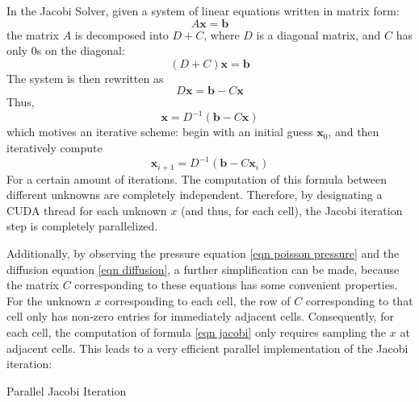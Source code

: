 In the Jacobi Solver, given a system of linear equations written in matrix form:
$$
A\textbf{x}=\textbf{b}
$$
the matrix $A$ is decomposed into $D+C$, where $D$ is a diagonal matrix, and $C$ has only $0$s on the diagonal:
$$
(D+C)\textbf{x}=\textbf{b}
$$
The system is then rewritten as 
$$
D\textbf{x}=\textbf{b} - C\textbf{x}
$$
Thus,
$$
\textbf{x}=D^{-1}(\textbf{b} - C\textbf{x})
$$
which motives an iterative scheme: begin with an initial guess $\textbf{x}_0$, and then iteratively compute
\begin{equation}
    \textbf{x}_{i+1} = D^{-1}(\textbf{b} - C\textbf{x}_{i})
    \label{eqn jacobi}
\end{equation}
For a certain amount of iterations. The computation of this formula between different unknowns are completely independent. Therefore, by designating a CUDA thread for each unknown $x$ (and thus, for each cell), the Jacobi iteration step is completely parallelized.

Additionally, by observing the pressure equation \ref{eqn poisson pressure} and the diffusion equation \ref{eqn diffusion}, a further simplification can be made, because the matrix $C$ corresponding to these equations has some convenient properties. For the unknown $x$ corresponding to each cell, the row of $C$ corresponding to that cell only has non-zero entries for immediately adjacent cells. Consequently, for each cell, the computation of formula \ref{eqn jacobi} only requires sampling the $x$ at adjacent cells. This leads to a very efficient parallel implementation of the Jacobi iteration:


\begin{algorithm}[H]
    \label{algo jacobi}
    \SetAlgoLined
    
    
    \caption{Parallel Jacobi Iteration}
\end{algorithm}

